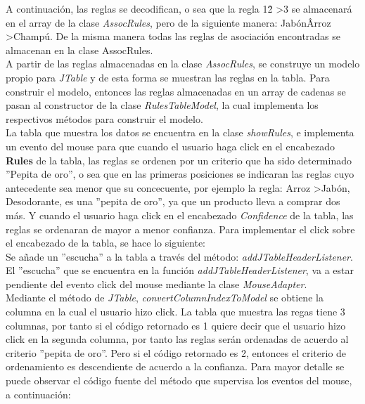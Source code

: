A continuaci\'on, las reglas se decodifican, o sea que la regla 1\^ 2\- >3 se almacenar\'a en el array de la clase
\textit{AssocRules}, pero de la siguiente manera: Jab\'on\^ Arroz\- >Champ\'u. De la misma manera todas las reglas
de asociaci\'on encontradas se almacenan en la clase AssocRules.\\

A partir de las reglas almacenadas en la clase \textit{AssocRules}, se construye un modelo propio para
\textit{JTable} y de esta forma se muestran las reglas en la tabla. Para construir el modelo, entonces las reglas
almacenadas en un array de cadenas se pasan al constructor de la clase \textit{RulesTableModel}, la cual
implementa los respectivos m\'etodos para construir el modelo.\\

La tabla que muestra los datos se encuentra en la clase \textit{showRules}, e implementa un evento del mouse para
que cuando el usuario haga click en el encabezado \textbf{Rules} de la tabla, las reglas se ordenen por un
criterio que ha sido determinado ''Pepita de oro'', o sea que en las primeras posiciones se indicaran las reglas
cuyo antecedente sea menor que su concecuente, por ejemplo la regla: Arroz\- >Jab\'on, Desodorante, es una
''pepita de oro'', ya que un producto lleva a comprar dos m\'as. Y cuando el usuario haga click en el encabezado
\textit{Confidence} de la tabla, las reglas se ordenaran de mayor a menor confianza. Para implementar el click
sobre el encabezado de la tabla, se hace lo siguiente:\\

Se a\~nade un ''escucha'' a la tabla a trav\'es del m\'etodo: \textit{addJTableHeaderListener}.\\

El ''escucha'' que se encuentra en la funci\'on \textit{addJTableHeaderListener}, va a estar pendiente del evento
click del mouse mediante la clase \textit{MouseAdapter}.\\

Mediante el m\'etodo de \textit{JTable}, \textit{convertColumnIndexToModel} se obtiene la columna en la cual el
usuario hizo click. La tabla que muestra las regas tiene 3 columnas, por tanto si el c\'odigo retornado es 1
quiere decir que el usuario hizo click en la segunda columna, por tanto las reglas ser\'an ordenadas de acuerdo al
criterio ''pepita de oro''. Pero si el c\'odigo retornado es 2, entonces el criterio de ordenamiento es
descendiente de acuerdo a la confianza. Para mayor detalle se puede observar el c\'odigo fuente del m\'etodo que
supervisa los eventos del mouse, a continuaci\'on: \\

